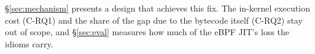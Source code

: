 \S\ref{sec:mechanism} presents a design that achieves this fix.
The in-kernel execution cost (C-RQ1) and the share of the gap due to the bytecode itself (C-RQ2) stay out of scope, and \S\ref{sec:eval} measures how much of the eBPF JIT's loss the idioms carry.
